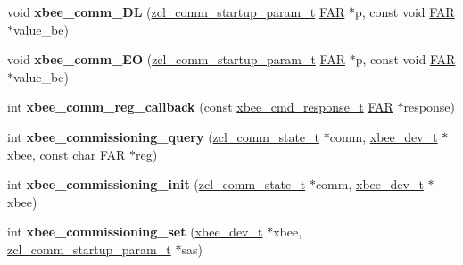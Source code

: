 \begin{DoxyCompactItemize}
\item 
\hypertarget{group__xbee__commissioning_ga337f66d75fea43d5a792ffd534e2f65c}{void {\bfseries xbee\-\_\-comm\-\_\-\-D\-L} (\hyperlink{structzcl__comm__startup__param__t}{zcl\-\_\-comm\-\_\-startup\-\_\-param\-\_\-t} \hyperlink{group__hal_gaef060b3456fdcc093a7210a762d5f2ed}{F\-A\-R} $\ast$p, const void \hyperlink{group__hal_gaef060b3456fdcc093a7210a762d5f2ed}{F\-A\-R} $\ast$value\-\_\-be)}\label{group__xbee__commissioning_ga337f66d75fea43d5a792ffd534e2f65c}

\item 
\hypertarget{group__xbee__commissioning_ga22b333ec115d26b72abc100fc5d3c431}{void {\bfseries xbee\-\_\-comm\-\_\-\-E\-O} (\hyperlink{structzcl__comm__startup__param__t}{zcl\-\_\-comm\-\_\-startup\-\_\-param\-\_\-t} \hyperlink{group__hal_gaef060b3456fdcc093a7210a762d5f2ed}{F\-A\-R} $\ast$p, const void \hyperlink{group__hal_gaef060b3456fdcc093a7210a762d5f2ed}{F\-A\-R} $\ast$value\-\_\-be)}\label{group__xbee__commissioning_ga22b333ec115d26b72abc100fc5d3c431}

\item 
\hypertarget{group__xbee__commissioning_gaec84ef238a638e643c6f8b363630d636}{int {\bfseries xbee\-\_\-comm\-\_\-reg\-\_\-callback} (const \hyperlink{structxbee__cmd__response__t}{xbee\-\_\-cmd\-\_\-response\-\_\-t} \hyperlink{group__hal_gaef060b3456fdcc093a7210a762d5f2ed}{F\-A\-R} $\ast$response)}\label{group__xbee__commissioning_gaec84ef238a638e643c6f8b363630d636}

\item 
\hypertarget{group__xbee__commissioning_ga4927f3fc029f50dbbd1ec3e0292e873b}{int {\bfseries xbee\-\_\-commissioning\-\_\-query} (\hyperlink{structzcl__comm__state__t}{zcl\-\_\-comm\-\_\-state\-\_\-t} $\ast$comm, \hyperlink{structxbee__dev__t}{xbee\-\_\-dev\-\_\-t} $\ast$xbee, const char \hyperlink{group__hal_gaef060b3456fdcc093a7210a762d5f2ed}{F\-A\-R} $\ast$reg)}\label{group__xbee__commissioning_ga4927f3fc029f50dbbd1ec3e0292e873b}

\item 
\hypertarget{group__xbee__commissioning_ga9c6e11a80f7544775d5e0d855f840334}{int {\bfseries xbee\-\_\-commissioning\-\_\-init} (\hyperlink{structzcl__comm__state__t}{zcl\-\_\-comm\-\_\-state\-\_\-t} $\ast$comm, \hyperlink{structxbee__dev__t}{xbee\-\_\-dev\-\_\-t} $\ast$xbee)}\label{group__xbee__commissioning_ga9c6e11a80f7544775d5e0d855f840334}

\item 
\hypertarget{group__xbee__commissioning_ga6fb796928aa5ff990ca4b62c4893bc2c}{int {\bfseries xbee\-\_\-commissioning\-\_\-set} (\hyperlink{structxbee__dev__t}{xbee\-\_\-dev\-\_\-t} $\ast$xbee, \hyperlink{structzcl__comm__startup__param__t}{zcl\-\_\-comm\-\_\-startup\-\_\-param\-\_\-t} $\ast$sas)}\label{group__xbee__commissioning_ga6fb796928aa5ff990ca4b62c4893bc2c}


\end{DoxyCompactItemize}
